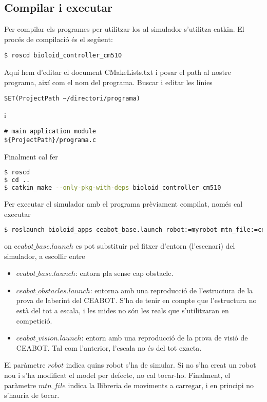 \documentclass{article}
\begin{document}
\subsection{Compilar i executar}
Per compilar els programes per utilitzar-los al simulador s'utilitza catkin. El procés de compilació és el següent:
\begin{lstlisting}
$ roscd bioloid_controller_cm510
\end{lstlisting}
Aquí hem d'editar el document CMakeLists.txt i posar el path al nostre programa, així com el nom del programa. Buscar i editar les línies

\begin{lstlisting}
SET(ProjectPath ~/directori/programa)
\end{lstlisting} 
i
\begin{lstlisting}
# main application module
${ProjectPath}/programa.c
\end{lstlisting}
Finalment cal fer
\begin{lstlisting}[language=bash]
$ roscd
$ cd ..
$ catkin_make --only-pkg-with-deps bioloid_controller_cm510
\end{lstlisting}

Per executar el simulador amb el programa prèviament compilat, només cal executar
\begin{lstlisting}[language=bash]
$ roslaunch bioloid_apps ceabot_base.launch robot:=myrobot mtn_file:=ceabot_motions
\end{lstlisting}
on c$eabot\_base.launch$ es pot substituir pel fitxer d'entorn (l'escenari) del simulador, a escollir entre
\begin{itemize}
\item $ceabot\_base.launch$: entorn pla sense cap obstacle.
\item $ceabot\_obstacles.launch$: entorna amb una reproducció de l'estructura de la prova de laberint del CEABOT. S'ha de tenir en compte que l'estructura no està del tot a escala, i les mides no són les reals que s'utilitzaran en competició.
\item $ceabot\_vision.launch$: entorn amb una reproducció de la prova de visió de CEABOT. Tal com l'anterior, l'escala no és del tot exacta.
\end{itemize}
El paràmetre $robot$ indica quins robot s'ha de simular. Si no s'ha creat un robot nou i s'ha modificat el model per defecte, no cal tocar-ho. Finalment, el paràmetre $mtn\_file$ indica la llibreria de moviments a carregar, i en principi no s'hauria de tocar.
\end{document}
